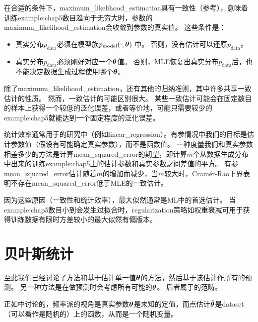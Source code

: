 在合适的条件下，\gls{maximum_likelihood_estimation}具有一致性（参考），意味着训练\gls{example:chap5}数目趋向于无穷大时，参数的\gls{maximum_likelihood_estimation}会收敛到参数的真实值。
这些条件是：
\begin{itemize}
    \item 真实分布$p_{\text{data}}$必须在模型族$p_{\text{model}}(\cdot; \boldsymbol{\theta})$ 中。
    否则，没有估计可以还原$p_{\text{data}}$。
    
    \item 真实分布$p_{\text{data}}$必须刚好对应一个$\boldsymbol{\theta}$值。
    否则，\gls{MLE}恢复出真实分布$p_{\text{data}}$后，也不能决定数据生成过程使用哪个$\boldsymbol{\theta}$。
\end{itemize}

除了\gls{maximum_likelihood_estimation}，还有其他的归纳准则，其中许多共享一致估计的性质。
然而，一致估计的可能区别很大。
某些一致估计可能会在固定数目的样本上获得一个较低的泛化误差，或者等价地，可能只需要较少的\gls{example:chap5}就能达到一个固定程度的泛化误差。

统计效率通常用于的研究中（例如\gls{linear_regression}）。有参情况中我们的目标是估计参数值（假设有可能确定真实参数），而不是函数值。
一种度量我们和真实参数相差多少的方法是计算\gls{mean_squared_error}的期望，即计算$m$个从数据生成分布中出来的训练\gls{example:chap5}上的估计参数和真实参数之间差值的平方。
有参\gls{mean_squared_error}估计随着$m$的增加而减少，当$m$较大时，Cram\'er-Rao下界\citep{Rao-1945,Cramer-1946}表明不存在\gls{mean_squared_error}低于\gls{MLE}的一致估计。

因为这些原因（一致性和统计效率），最大似然通常是\gls{ML}中的首选估计。
当\gls{example:chap5}数目小到会发生过拟合时，\gls{regularization}策略如权重衰减可用于获得训练数据有限时方差较小的最大似然有偏版本。


\section{贝叶斯统计}
\label{sec:bayesian_statistics}
至此我们已经讨论了方法和基于估计单一值$\boldsymbol{\theta}$的方法，然后基于该估计作所有的预测。
另一种方法是在做预测时会考虑所有可能的$\boldsymbol{\theta}$。
后者属于的范畴。

正如中讨论的，频率派的视角是真实参数$\boldsymbol{\theta}$是未知的定值，而点估计$\hat{\boldsymbol{\theta}}$是\gls{dataset}（可以看作是随机的）上的函数，从而是一个随机变量。

